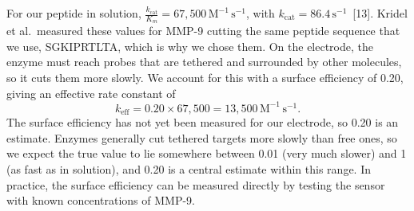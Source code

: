 \documentclass[10pt,a4paper]{article}
\numberwithin{equation}{section}
\newcommand{\cit}[1]{[#1]}
\newcommand{\keff}{k_{\mathrm{eff}}}
\newcommand{\kcat}{k_{\mathrm{cat}}}
\begin{document}
For our peptide in solution, $\frac{\kcat}{K_m} = 67{,}500\,\mathrm{M^{-1}\,s^{-1}}$, with $\kcat = 86.4\,\mathrm{s^{-1}}$~\cit{13}. Kridel et al.\ measured these values for MMP-9 cutting the same peptide sequence that we use, SGKIPRTLTA, which is why we chose them. On the electrode, the enzyme must reach probes that are tethered and surrounded by other molecules, so it cuts them more slowly. We account for this with a surface efficiency of 0.20, giving an effective rate constant of
\[ \keff = 0.20\times67{,}500 = 13{,}500\,\mathrm{M^{-1}\,s^{-1}}. \]
The surface efficiency has not yet been measured for our electrode, so 0.20 is an estimate. Enzymes generally cut tethered targets more slowly than free ones, so we expect the true value to lie somewhere between 0.01 (very much slower) and 1 (as fast as in solution), and 0.20 is a central estimate within this range. In practice, the surface efficiency can be measured directly by testing the sensor with known concentrations of MMP-9.
\end{document}
